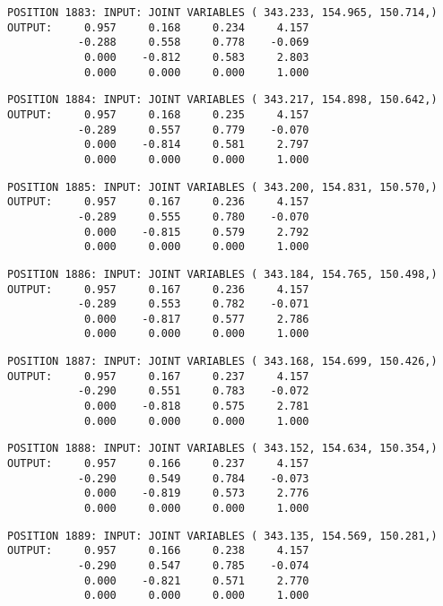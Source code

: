 \begin{verbatim}
POSITION 1883: INPUT: JOINT VARIABLES ( 343.233, 154.965, 150.714,)
OUTPUT:     0.957     0.168     0.234     4.157
           -0.288     0.558     0.778    -0.069
            0.000    -0.812     0.583     2.803
            0.000     0.000     0.000     1.000
\end{verbatim} \pagebreak[1]\begin{verbatim}
POSITION 1884: INPUT: JOINT VARIABLES ( 343.217, 154.898, 150.642,)
OUTPUT:     0.957     0.168     0.235     4.157
           -0.289     0.557     0.779    -0.070
            0.000    -0.814     0.581     2.797
            0.000     0.000     0.000     1.000
\end{verbatim} \pagebreak[1]\begin{verbatim}
POSITION 1885: INPUT: JOINT VARIABLES ( 343.200, 154.831, 150.570,)
OUTPUT:     0.957     0.167     0.236     4.157
           -0.289     0.555     0.780    -0.070
            0.000    -0.815     0.579     2.792
            0.000     0.000     0.000     1.000
\end{verbatim} \pagebreak[1]\begin{verbatim}
POSITION 1886: INPUT: JOINT VARIABLES ( 343.184, 154.765, 150.498,)
OUTPUT:     0.957     0.167     0.236     4.157
           -0.289     0.553     0.782    -0.071
            0.000    -0.817     0.577     2.786
            0.000     0.000     0.000     1.000
\end{verbatim} \pagebreak[1]\begin{verbatim}
POSITION 1887: INPUT: JOINT VARIABLES ( 343.168, 154.699, 150.426,)
OUTPUT:     0.957     0.167     0.237     4.157
           -0.290     0.551     0.783    -0.072
            0.000    -0.818     0.575     2.781
            0.000     0.000     0.000     1.000
\end{verbatim} \pagebreak[1]\begin{verbatim}
POSITION 1888: INPUT: JOINT VARIABLES ( 343.152, 154.634, 150.354,)
OUTPUT:     0.957     0.166     0.237     4.157
           -0.290     0.549     0.784    -0.073
            0.000    -0.819     0.573     2.776
            0.000     0.000     0.000     1.000
\end{verbatim} \pagebreak[1]\begin{verbatim}
POSITION 1889: INPUT: JOINT VARIABLES ( 343.135, 154.569, 150.281,)
OUTPUT:     0.957     0.166     0.238     4.157
           -0.290     0.547     0.785    -0.074
            0.000    -0.821     0.571     2.770
            0.000     0.000     0.000     1.000
\end{verbatim} \pagebreak[1]\begin{verbatim}

\end{verbatim}
